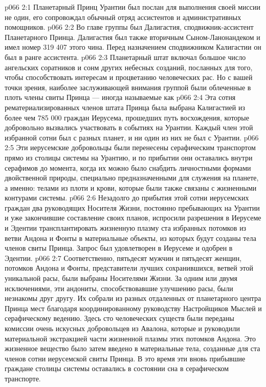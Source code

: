 \vs p066 2:1 Планетарный Принц Урантии был послан для выполнения своей миссии не один, его сопровождал обычный отряд ассистентов и административных помощников.
\vs p066 2:2 Во главе группы был Далигастия, сподвижник\hyp{}ассистент Планетарного Принца. Далигастия был также вторичным Сыном\hyp{}Ланонандеком и имел номер 319 407 этого чина. Перед назначением сподвижником Калигастии он был в ранге ассистента.
\vs p066 2:3 Планетарный штат включал большое число ангельских соратников и сонм других небесных созданий, посланных для того, чтобы способствовать интересам и процветанию человеческих рас. Но с вашей точки зрения, наиболее заслуживающей внимания группой были облеченные в плоть члены свиты Принца --- иногда называемые как 
\vs p066 2:4 \pc Эта сотня рематериализированных членов штата Принца была выбрана Калигастией из более чем 785 000 граждан Иерусема, прошедших путь восхождения, которые добровольно вызвались участвовать в событиях на Урантии. Каждый член этой избранной сотни был с разных планет, и ни один из них не был с Урантии.
\vs p066 2:5 Эти иерусемские добровольцы были перенесены серафическим транспортом прямо из столицы системы на Урантию, и по прибытии они оставались внутри серафимов до момента, когда их можно было снабдить личностными формами двойственной природы, специально предназначенными для служения на планете, а именно: телами из плоти и крови, которые были также связаны с жизненными контурами системы.
\vs p066 2:6 \pc Незадолго до прибытия этой сотни иерусемских граждан два руководящих Носителя Жизни, постоянно пребывающих на Урантии и уже закончившие составление своих планов, испросили разрешения в Иерусеме и Эдентии трансплантировать жизненную плазму ста избранных потомков из ветви Андона и Фонты в материальные объекты, из которых будут созданы тела членов свиты Принца. Запрос был удовлетворен в Иерусеме и одобрен в Эдентии.
\vs p066 2:7 Соответственно, пятьдесят мужчин и пятьдесят женщин, потомков Андона и Фонты, представители лучших сохранившихся, ветвей этой уникальной расы, были выбраны Носителями Жизни. За одним или двумя исключениями, эти андониты, способствовавшие улучшению расы, были незнакомы друг другу. Их собрали из разных отдаленных от планетарного центра Принца мест благодаря координированному руководству Настройщиков Мыслей и серафическому ведению. Здесь сто человеческих существ были переданы комиссии очень искусных добровольцев из Авалона, которые и руководили материальной экстракцией части жизненной плазмы этих потомков Андона. Это жизненное вещество было затем введено в материальные тела, созданные для ста членов сотни иерусемской свиты Принца. В это время эти вновь прибывшие граждане столицы системы оставались в состоянии сна в серафическом транспорте.
